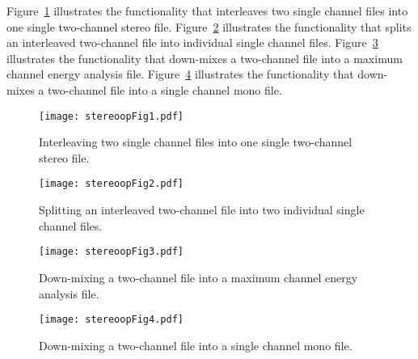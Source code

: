 Figure~\ref{fig:stereoopFig1} illustrates the functionality that
interleaves two single channel files into one single two-channel
stereo file. Figure~\ref{fig:stereoopFig2} illustrates the
functionality that splits an interleaved two-channel file into
individual single channel files. Figure~\ref{fig:stereoopFig3}
illustrates the functionality that down-mixes a two-channel file into
a maximum channel energy analysis file. Figure~\ref{fig:stereoopFig4}
illustrates the functionality that down-mixes a two-channel file into
a single channel mono
file.

\begin{figure}[htp]
    \begin{center}
        \texttt{[image: stereoopFig1.pdf]}
  \end{center}
  \caption{Interleaving two single channel files into one single two-channel stereo file.
           \label{fig:stereoopFig1} }
\end{figure}

\begin{figure}[htp]
    \begin{center}
        \texttt{[image: stereoopFig2.pdf]}
  \end{center}
  \caption{Splitting an interleaved two-channel file into two individual single channel files.
           \label{fig:stereoopFig2} }
\end{figure}

\begin{figure}[htp]
    \begin{center}
        \texttt{[image: stereoopFig3.pdf]}
  \end{center}
  \caption{Down-mixing a two-channel file into a maximum channel energy analysis file.
           \label{fig:stereoopFig3} }
\end{figure}

\begin{figure}[htp]
    \begin{center}
        \texttt{[image: stereoopFig4.pdf]}
  \end{center}
  \caption{Down-mixing a two-channel file into a single channel mono file.
           \label{fig:stereoopFig4} }
\end{figure}


